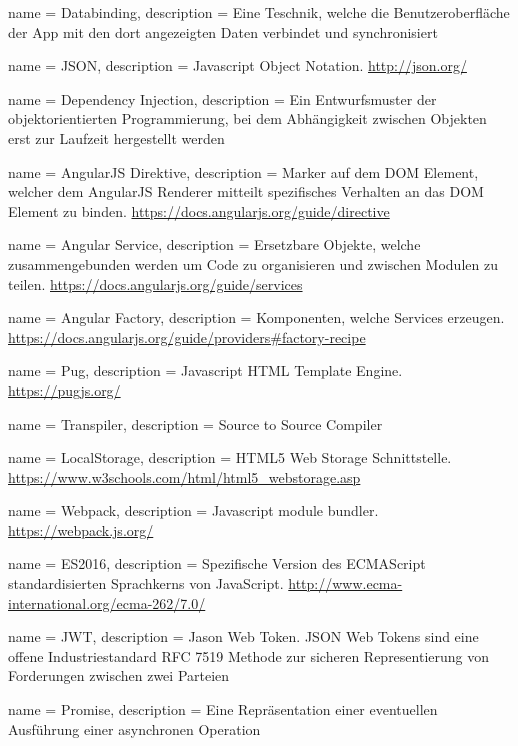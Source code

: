 {
  name = Databinding,
  description = {  Eine Teschnik, welche die Benutzeroberfläche der App mit den dort angezeigten Daten verbindet und synchronisiert }
}

{
  name = JSON,
  description = { Javascript Object Notation. \url{http://json.org/} }
}

{
  name = Dependency Injection,
  description = { Ein Entwurfsmuster der objektorientierten Programmierung, bei dem Abhängigkeit zwischen Objekten erst zur Laufzeit hergestellt werden }
}

{
  name = AngularJS Direktive,
  description = { Marker auf dem DOM Element, welcher dem AngularJS Renderer mitteilt spezifisches Verhalten an das DOM Element zu binden. \url{https://docs.angularjs.org/guide/directive}}
}

{
  name = Angular Service,
  description = { Ersetzbare Objekte, welche zusammengebunden werden um Code zu organisieren und zwischen Modulen zu teilen. \url{https://docs.angularjs.org/guide/services}}
}

{
  name = Angular Factory,
  description = { Komponenten, welche Services erzeugen. \url{https://docs.angularjs.org/guide/providers\#factory-recipe}}
}


{
  name = Pug,
  description = { Javascript HTML Template Engine. \url{https://pugjs.org/} }
}

{
  name = Transpiler,
  description = {Source to Source Compiler}
}

{
  name = LocalStorage,
  description = { HTML5 Web Storage Schnittstelle. \url{https://www.w3schools.com/html/html5\_webstorage.asp} }
}


{
  name = Webpack,
  description = { Javascript module bundler. \url{https://webpack.js.org/}}
}

{
  name = ES2016,
  description = { Spezifische Version des ECMAScript standardisierten Sprachkerns von JavaScript. \url{http://www.ecma-international.org/ecma-262/7.0/}}
}


{
  name = JWT,
  description = {Jason Web Token. JSON Web Tokens sind eine offene Industriestandard RFC 7519 Methode zur sicheren Representierung von Forderungen zwischen zwei Parteien }
}

{
  name = Promise,
  description = {Eine Repräsentation einer eventuellen Ausführung einer asynchronen Operation}

}
